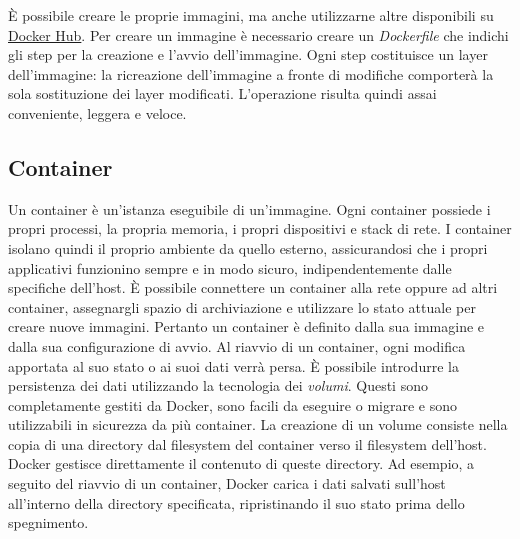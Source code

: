 È possibile creare le proprie immagini, ma anche utilizzarne altre disponibili su \hyperref[docker-hub]{Docker Hub}. Per creare un immagine è necessario creare un \emph{Dockerfile} che indichi gli step per la creazione e l'avvio dell'immagine. Ogni step costituisce un layer dell'immagine: la ricreazione dell'immagine a fronte di modifiche comporterà la sola sostituzione dei layer modificati. L'operazione risulta quindi assai conveniente, leggera e veloce.

\subsection{Container}
Un container è un'istanza eseguibile di un'immagine. Ogni container possiede i propri processi, la propria memoria, i propri dispositivi e stack di rete. I container isolano quindi il proprio ambiente da quello esterno, assicurandosi che i propri applicativi funzionino sempre e in modo sicuro, indipendentemente dalle specifiche dell'host. È possibile connettere un container alla rete oppure ad altri container, assegnargli spazio di archiviazione e utilizzare lo stato attuale per creare nuove immagini. Pertanto un container è definito dalla sua immagine e dalla sua configurazione di avvio. Al riavvio di un container, ogni modifica apportata al suo stato o ai suoi dati verrà persa. È possibile introdurre la persistenza dei dati utilizzando la tecnologia dei \emph{volumi}. Questi sono completamente gestiti da Docker, sono facili da eseguire o migrare e sono utilizzabili in sicurezza da più container. La creazione di un volume consiste nella copia di una directory dal filesystem del container verso il filesystem dell'host. Docker gestisce direttamente il contenuto di queste directory. Ad esempio, a seguito del riavvio di un container, Docker carica i dati salvati sull'host all'interno della directory specificata, ripristinando il suo stato prima dello spegnimento.

